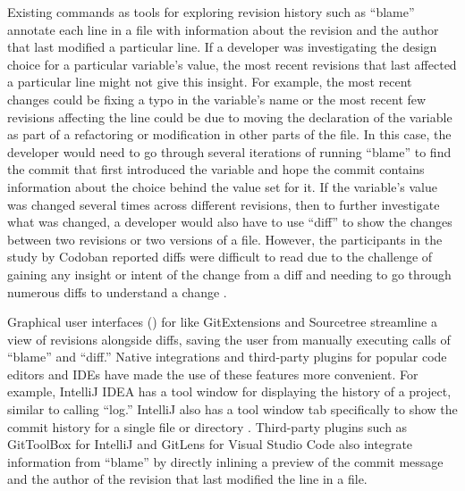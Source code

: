 Existing  commands as tools for exploring revision history such 
as ``blame'' \cite{gitblame} annotate each line in a file with information about the revision 
and the author that last modified a particular line.
If a developer was investigating the design choice for a particular variable's value, 
the most recent revisions that last affected a particular line might not give this insight.
For example, the most recent changes could be fixing a typo in the variable's name or the most recent 
few revisions affecting the line could be due to moving the declaration of the variable as part 
of a refactoring or modification in other parts of the file.
In this case, the developer would need to go through several iterations of running ``blame'' 
to find the commit that first introduced the variable and hope the commit contains information 
about the choice behind the value set for it.
If the variable's value was changed several times across different revisions, 
then to further investigate what was changed, 
a developer would also have to use  ``diff'' \cite{gitdiff} to show the 
changes between two revisions or two versions of a file.
However, the participants in the study by Codoban \etal reported diffs were difficult 
to read due to the challenge of gaining any insight or intent of the change from a diff 
and needing to go through numerous diffs to understand a change \cite{codoban_software_2015}.

Graphical user interfaces () for  like GitExtensions \cite{gitextensions} 
and Sourcetree \cite{sourcetree} streamline a view of revisions alongside diffs, 
saving the user from manually executing calls of  ``blame'' and ``diff.'' 
Native  integrations and third-party plugins for popular code editors and IDEs 
have made the use of these  features more convenient. 
For example, IntelliJ IDEA \cite{intellij} has a tool window for displaying the  
history of a project, similar to calling  ``log.''
IntelliJ also has a tool window tab specifically to show the commit history 
for a single file or directory \cite{intellij-showhistory}.
Third-party plugins such as GitToolBox \cite{gittoolbox} for IntelliJ and GitLens \cite{gitlens} 
for Visual Studio Code also integrate information from  ``blame'' by directly 
inlining a preview of the commit message and the author of the revision that last modified the line in a file.

